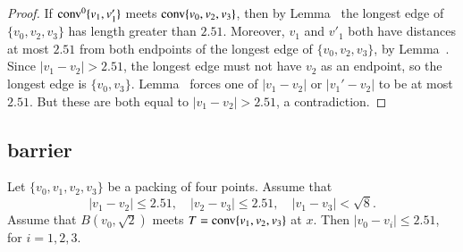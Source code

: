\begin{tarskidata}
\begin{tarski}
\begin{proof}
If ${\operatorname{conv}}^0\{v_1,v'_1\}$ meets ${\operatorname{conv}}\{v_0,v_2,v_3\}$, then by
Lemma~ the longest edge of $\{v_0,v_2,v_3\}$
has length greater than $2.51$. 
Moreover, $v_1$ and $v'_1$ both have distances at most $2.51$
from both endpoints of the longest edge of $\{v_0,v_2,v_3\}$, 
by Lemma~.  Since
$|v_1-v_2|>2.51$, the longest edge must not have $v_2$ as an endpoint,
so the longest edge is $\{v_0,v_3\}$.
Lemma~ forces one of $|v_1-v_2|$ or
$|v_1'-v_2|$ to be at most $2.51$. But these are both equal to
$|v_1-v_2|>2.51$, a contradiction.
\end{proof}
\end{tarski}













\begin{tarski}
\subsection{barrier}

\begin{lemma}
Let $\{v_0,v_1,v_2,v_3\}$ be a packing of four points.
Assume that 
$$
   |v_1-v_2|\le 2.51,\quad |v_2-v_3|\le 2.51,\quad |v_1-v_3|<\sqrt8.
$$
Assume that $B(v_0,\sqrt2)$ meets $T={\operatorname{conv}}\{v_1,v_2,v_3\}$ at $x$.
Then $|v_0-v_i|\le 2.51$, for $i=1,2,3$.
\end{lemma}



\end{tarski}
\end{tarskidata}
